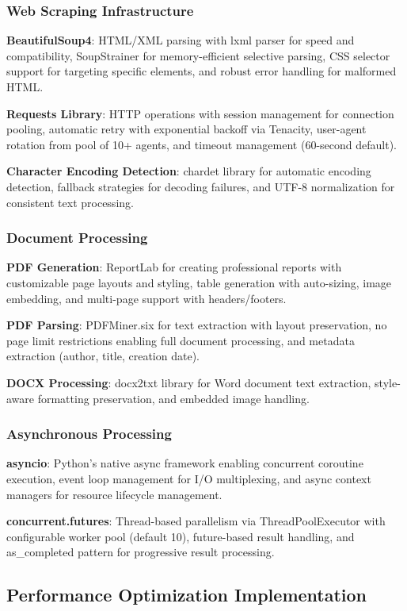 \documentclass[conference]{IEEEtran}
\begin{document}
\subsubsection{Web Scraping Infrastructure}
\textbf{BeautifulSoup4}: HTML/XML parsing with lxml parser for speed and compatibility, SoupStrainer for memory-efficient selective parsing, CSS selector support for targeting specific elements, and robust error handling for malformed HTML.

\textbf{Requests Library}: HTTP operations with session management for connection pooling, automatic retry with exponential backoff via Tenacity, user-agent rotation from pool of 10+ agents, and timeout management (60-second default).

\textbf{Character Encoding Detection}: chardet library for automatic encoding detection, fallback strategies for decoding failures, and UTF-8 normalization for consistent text processing.

\subsubsection{Document Processing}
\textbf{PDF Generation}: ReportLab for creating professional reports with customizable page layouts and styling, table generation with auto-sizing, image embedding, and multi-page support with headers/footers.

\textbf{PDF Parsing}: PDFMiner.six for text extraction with layout preservation, no page limit restrictions enabling full document processing, and metadata extraction (author, title, creation date).

\textbf{DOCX Processing}: docx2txt library for Word document text extraction, style-aware formatting preservation, and  embedded image handling.

\subsubsection{Asynchronous Processing}
\textbf{asyncio}: Python's native async framework enabling concurrent coroutine execution, event loop management for I/O multiplexing, and async context managers for resource lifecycle management.

\textbf{concurrent.futures}: Thread-based parallelism via ThreadPoolExecutor with configurable worker pool (default 10), future-based result handling, and as\_completed pattern for progressive result processing.

\subsection{Performance Optimization Implementation}
\end{document}
